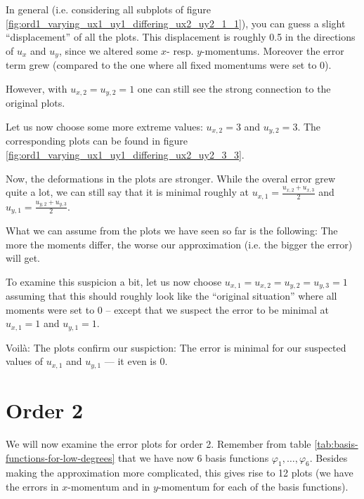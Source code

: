\documentclass{article}
\renewcommand{\phi}{\varphi}
\begin{document}
In general (i.e. considering all subplots of figure \ref{fig:ord1_varying_ux1_uy1_differing_ux2_uy2_1_1}), you can guess a slight ``displacement'' of all the plots. This displacement is roughly 0.5 in the directions of $u_x$ and $u_y$, since we altered some $x$- resp. $y$-momentums. Moreover the error term grew (compared to the one where all fixed momentums were set to 0).

However, with $u_{x,2}=u_{y,2}=1$ one can still see the strong connection to the original plots. 

Let us now choose some more extreme values: $u_{x,2}=3$ and $u_{y,2}=3$. The corresponding plots can be found in figure \ref{fig:ord1_varying_ux1_uy1_differing_ux2_uy2_3_3}.



Now, the deformations in the plots are stronger. While the overal error grew quite a lot, we can still say that it is minimal roughly at $u_{x,1}=\frac{u_{x,2}+u_{x,3}}{2}$ and $u_{y,1}=\frac{u_{y,2}+u_{y,3}}{2}$.

What we can assume from the plots we have seen so far is the following: The more the moments differ, the worse our approximation (i.e. the bigger the error) will get.

To examine this suspicion a bit, let us now choose $u_{x,1}=u_{x,2}=u_{y,2}=u_{y,3}=1$ assuming that this should roughly look like the ``original situation'' where all moments were set to 0 -- except that we suspect the error to be minimal at $u_{x,1}=1$ and $u_{y,1}=1$.



Voilà: The plots confirm our suspiction: The error is minimal for our suspected values of $u_{x,1}$ and $u_{y,1}$ --- it even is 0.

\clearpage{}

\section{Order 2}
\label{sec:stiffness-analyis-ord-2}

We will now examine the error plots for order 2. Remember from table \ref{tab:basis-functions-for-low-degrees} that we have now 6 basis functions $\phi_1,\dots,\phi_6$. Besides making the approximation more complicated, this gives rise to 12 plots (we have the errors in $x$-momentum and in $y$-momentum for each of the basis functions).
\end{document}
